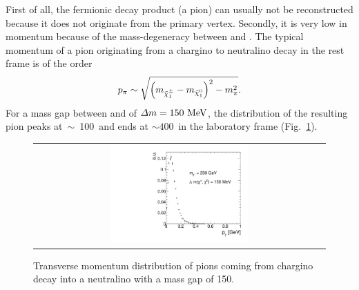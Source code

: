First of all, the fermionic decay product (\eg a pion) can usually not be reconstructed because it does not originate from the primary vertex.
Secondly, it is very low in momentum because of the mass-degeneracy between \chipm and \chiO.
The typical momentum of a pion originating from a chargino to neutralino decay in the \chipm rest frame is of the order 
\begin{equation}
p_{\pi}\sim \sqrt{ \left( m_{\tilde{\chi}^{\pm}_{1}} - m_{\tilde{\chi}^{0}_{1}} \right)^2 - m_{\pi}^2}.
\end{equation}
For a mass gap between \chipm and \chiO of $\Delta m=150\, \,\text{Me}\kern-0.06667em\text{V}$, the \pt distribution of the resulting pion peaks \mbox{at $\sim$ 100\,\mev} and ends at \mbox{\pt $\sim 400\,$\mev} in the laboratory frame (Fig.~\ref{fig:ptOfPions}).
\begin{figure}[!t]
  \centering 
 \vspace{10pt}
  \begin{tabular}{c}
    \includegraphics[width=0.49\textwidth]{figures/analysis/PtOfPions.pdf}
  \end{tabular}
  \caption{Transverse momentum distribution of pions coming from chargino decay into a neutralino with a mass gap of 150\mev.}
  \label{fig:ptOfPions}
\vspace{70pt}
\end{figure} 


